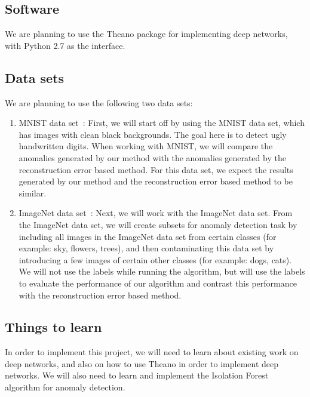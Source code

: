 \documentclass[10pt,twocolumn,letterpaper]{article}
\begin{document}
\subsection{Software}
We are planning to use the Theano package for implementing deep networks, with Python 2.7 as the interface.


\subsection{Data sets}
We are planning to use the following two data sets:
\begin{enumerate}
\item MNIST data set~\cite{mnist}: First, we will start off by using the MNIST data set, which has images with clean black backgrounds. The goal here is to detect ugly handwritten digits. When working with MNIST, we will compare the anomalies generated by our method with the anomalies generated by the reconstruction error based method. For this data set, we expect the results generated by our method and the reconstruction error based method to be similar.
\item ImageNet data set~\cite{imagenet}: Next, we will work with the ImageNet data set. From the ImageNet data set, we will create subsets for anomaly detection task by including all images in the ImageNet data set from certain classes (for example: sky, flowers, trees), and then contaminating this data set by introducing a few images of certain other classes (for example: dogs, cats). We will not use the labels while running the algorithm, but will use the labels to evaluate the performance of our algorithm and contrast this performance with the reconstruction error based method.


\end{enumerate}

\subsection{Things to learn}
In order to implement this project, we will need to learn about existing work on deep networks, and also on how to use Theano in order to implement deep networks. We will also need to learn and implement the Isolation Forest algorithm for anomaly detection.
\end{document}

